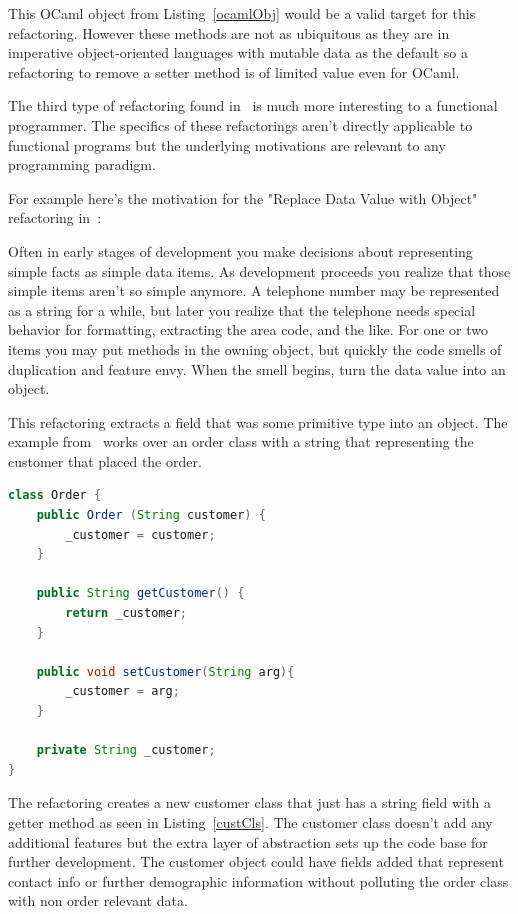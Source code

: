 This OCaml object from Listing~\ref{ocamlObj} would be a valid target for this refactoring. However these methods are not as ubiquitous as they are in imperative object-oriented languages with mutable data as the default so a refactoring to remove a setter method is of limited value even for OCaml.

The third type of refactoring found in~\citep{fowler} is much more interesting to a functional programmer. The specifics of these refactorings aren't directly applicable to functional programs but the underlying motivations are relevant to any programming paradigm. 

For example here's the motivation for the "Replace Data Value with Object" refactoring in~\citep[pg. 175]{fowler}:

\begin{displayquote}
Often in early stages of development you make decisions about representing simple facts as simple data items. As development proceeds you realize that those simple items aren't so simple anymore. A telephone number may be represented as a string for a while, but later you realize that the telephone needs special behavior for formatting, extracting the area code, and the like. For one or two items you may put methods in the owning object, but quickly the code smells of duplication and feature envy. When the smell begins, turn the data value into an object.
\end{displayquote}

This refactoring extracts a field that was some primitive type into an object. The example from~\citep{fowler} works over an order class with a string that representing the customer that placed the order.

\begin{lstlisting}[caption={The Order class}, language = java, captionpos=b,tabsize=4]
class Order {
	public Order (String customer) {
		_customer = customer;	
	}
	
	public String getCustomer() {
		return _customer;
	}
	
	public void setCustomer(String arg){
		_customer = arg;	
	}
	
	private String _customer;
}
\end{lstlisting}

The refactoring creates a new customer class that just has a string field with a getter method as seen in Listing~\ref{custCls}. The customer class doesn't add any additional features but the extra layer of abstraction sets up the code base for further development. The customer object could have fields added that represent contact info or further demographic information without polluting the order class with non order relevant data.

